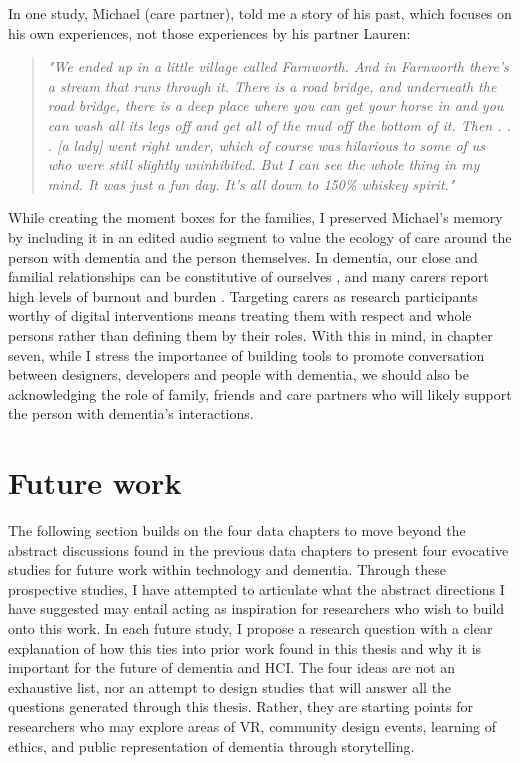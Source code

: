 In one study, Michael (care partner), told me a story of his past, which focuses on his own experiences, not those experiences by his partner Lauren:
\begin{quote}
\textit{"We ended up in a little village called Farnworth. And in Farnworth there's a stream that runs through it. There is a road bridge, and underneath the road bridge, there is a deep place where you can get your horse in and you can wash all its legs off and get all of the mud off the bottom of it. Then . . . [a lady] went right under, which of course was hilarious to some of us who were still slightly uninhibited. But I can see the whole thing in my mind. It was just a fun day. It's all down to 150\% whiskey spirit."}
\end{quote}
While creating the moment boxes for the families, I preserved Michael's memory by including it in an edited audio segment to value the ecology of care around the person with dementia and the person themselves. In dementia, our close and familial relationships can be constitutive of ourselves \citep{wallace_making_2013}, and many carers report high levels of burnout and burden \citep{takai_experience_2009}. Targeting carers as research participants worthy of digital interventions means treating them with respect and whole persons rather than defining them by their roles. With this in mind, in chapter seven, while I stress the importance of building tools to promote conversation between designers, developers and people with dementia, we should also be acknowledging the role of family, friends and care partners who will likely support the person with dementia's interactions. 

\section{Future work}
\label{FutureWork}
The following section builds on the four data chapters to move beyond the abstract discussions found in the previous data chapters to present four evocative studies for future work within technology and dementia. Through these prospective studies, I have attempted to articulate what the abstract directions I have suggested may entail acting as inspiration for researchers who wish to build onto this work. In each future study, I propose a research question with a clear explanation of how this ties into prior work found in this thesis and why it is important for the future of dementia and HCI. The four ideas are not an exhaustive list, nor an attempt to design studies that will answer all the questions generated through this thesis. Rather, they are starting points for researchers who may explore areas of VR, community design events, learning of ethics, and public representation of dementia through storytelling.

